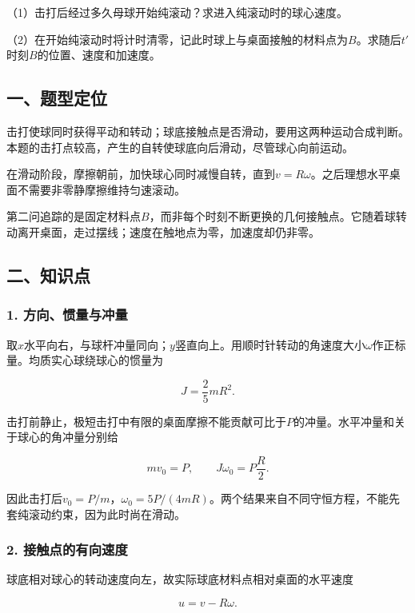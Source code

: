 \documentclass[12pt,a4paper,fontset=fandol]{ctexart}
\begin{document}
（1）击打后经过多久母球开始纯滚动？求进入纯滚动时的球心速度。

（2）在开始纯滚动时将计时清零，记此时球上与桌面接触的材料点为\(B\)。求随后\(t'\)时刻\(B\)的位置、速度和加速度。

\subsection{一、题型定位}\label{ux4e00ux9898ux578bux5b9aux4f4d-1}

击打使球同时获得平动和转动；球底接触点是否滑动，要用这两种运动合成判断。本题的击打点较高，产生的自转使球底向后滑动，尽管球心向前运动。

在滑动阶段，摩擦朝前，加快球心同时减慢自转，直到\(v=R\omega\)。之后理想水平桌面不需要非零静摩擦维持匀速滚动。

第二问追踪的是固定材料点\(B\)，而非每个时刻不断更换的几何接触点。它随着球转动离开桌面，走过摆线；速度在触地点为零，加速度却仍非零。

\subsection{二、知识点}\label{ux4e8cux77e5ux8bc6ux70b9-1}

\subsubsection{1.
方向、惯量与冲量}\label{ux65b9ux5411ux60efux91cfux4e0eux51b2ux91cf}

取\(x\)水平向右，与球杆冲量同向；\(y\)竖直向上。用顺时针转动的角速度大小\(\omega\)作正标量。均质实心球绕球心的惯量为

\[
J=\frac25mR^2.
\]

击打前静止，极短击打中有限的桌面摩擦不能贡献可比于\(P\)的冲量。水平冲量和关于球心的角冲量分别给

\[
mv_0=P,\qquad J\omega_0=P\frac R2.
\]

因此击打后\(v_0=P/m\)，\(\omega_0=5P/(4mR)\)。两个结果来自不同守恒方程，不能先套纯滚动约束，因为此时尚在滑动。

\subsubsection{2.
接触点的有向速度}\label{ux63a5ux89e6ux70b9ux7684ux6709ux5411ux901fux5ea6}

球底相对球心的转动速度向左，故实际球底材料点相对桌面的水平速度

\[
u=v-R\omega.
\]
\end{document}
